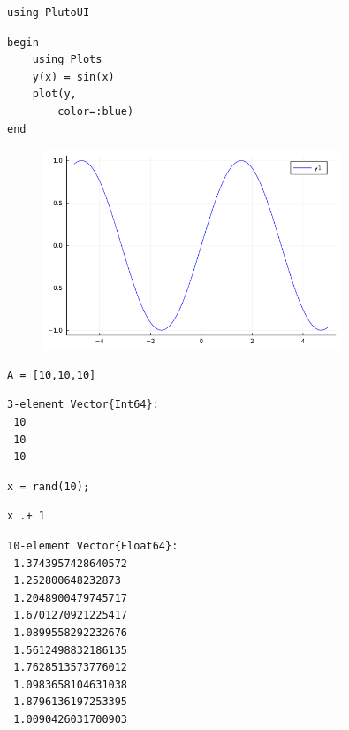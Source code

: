 \newpage

\begin{lstlisting}[language=JuliaLocal, style=julia]
using PlutoUI
\end{lstlisting}

\begin{lstlisting}[language=JuliaLocal, style=julia]
begin
	using Plots
	y(x) = sin(x)
	plot(y,
		color=:blue)
end
\end{lstlisting}

\begin{figure}[H]
	\centering
	\includegraphics[width=0.8\textwidth]{./figures/examplepluto_figure1.png}
	\label{fig:examplepluto_figure1.png}

\end{figure}

\begin{lstlisting}[language=JuliaLocal, style=julia]
A = [10,10,10]
\end{lstlisting}

\begin{verbatim}
3-element Vector{Int64}:
 10
 10
 10
\end{verbatim}

\begin{lstlisting}[language=JuliaLocal, style=julia]
x = rand(10);
\end{lstlisting}

\begin{lstlisting}[language=JuliaLocal, style=julia]
x .+ 1
\end{lstlisting}

\begin{verbatim}
10-element Vector{Float64}:
 1.3743957428640572
 1.252800648232873
 1.2048900479745717
 1.6701270921225417
 1.0899558292232676
 1.5612498832186135
 1.7628513573776012
 1.0983658104631038
 1.8796136197253395
 1.0090426031700903
\end{verbatim}

